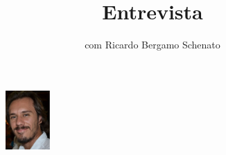 \title{Entrevista}
\subtitle{com Ricardo Bergamo Schenato}
\maketitle
\begin{figure}
\includegraphics[width=0.15\textwidth]{figuras/foto-ricardo}
\end{figure}








